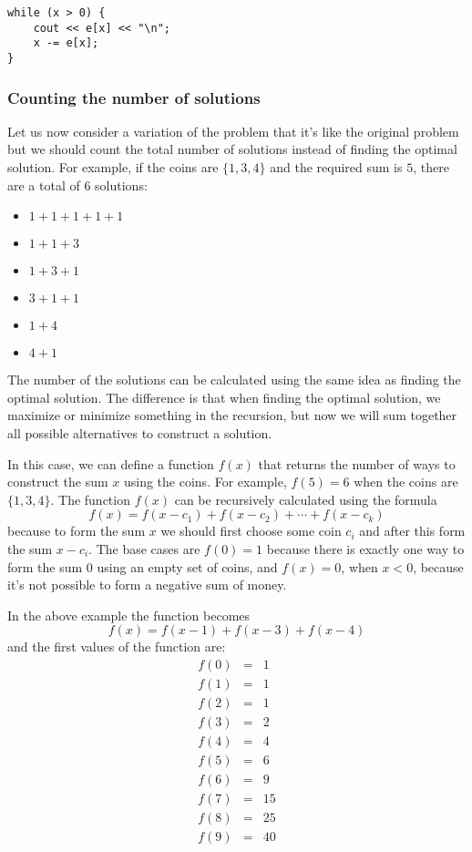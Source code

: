 \begin{lstlisting}
while (x > 0) {
    cout << e[x] << "\n";
    x -= e[x];
}
\end{lstlisting}

\subsubsection{Counting the number of solutions}

Let us now consider a variation of the problem
that it's like the original problem but we should
count the total number of solutions instead
of finding the optimal solution.
For example, if the coins are $\{1,3,4\}$ and
the required sum is $5$,
there are a total of 6 solutions:

\begin{multicols}{2}
\begin{itemize}
\item $1+1+1+1+1$
\item $1+1+3$
\item $1+3+1$
\item $3+1+1$
\item $1+4$
\item $4+1$
\end{itemize}
\end{multicols}

The number of the solutions can be calculated
using the same idea as finding the optimal solution.
The difference is that when finding the optimal solution,
we maximize or minimize something in the recursion,
but now we will sum together all possible alternatives to
construct a solution.

In this case, we can define a function $f(x)$
that returns the number of ways to construct
the sum $x$ using the coins.
For example, $f(5)=6$ when the coins are $\{1,3,4\}$.
The function $f(x)$ can be recursively calculated
using the formula
\[ f(x) = f(x-c_1)+f(x-c_2)+\cdots+f(x-c_k)\]
because to form the sum $x$ we should first
choose some coin $c_i$ and after this form the sum $x-c_i$.
The base cases are $f(0)=1$ because there is exactly
one way to form the sum 0 using an empty set of coins,
and $f(x)=0$, when $x<0$, because it's not possible
to form a negative sum of money.

In the above example the function becomes
\[ f(x) = f(x-1)+f(x-3)+f(x-4) \]
and the first values of the function are:
\[
\begin{array}{lcl}
f(0) & = & 1 \\
f(1) & = & 1 \\
f(2) & = & 1 \\
f(3) & = & 2 \\
f(4) & = & 4 \\
f(5) & = & 6 \\
f(6) & = & 9 \\
f(7) & = & 15 \\
f(8) & = & 25 \\
f(9) & = & 40 \\
\end{array}
\]

